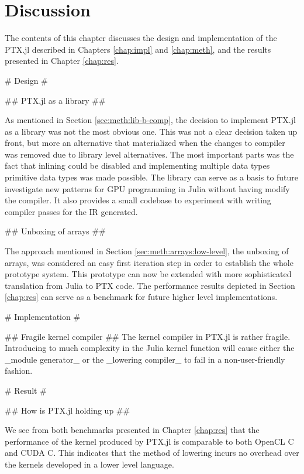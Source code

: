 \chapter{Discussion}
\begin{markdown}

The contents of this chapter discusses the design and implementation
of the PTX.jl described in Chapters \ref{chap:impl} and
\ref{chap:meth}, and the results presented in Chapter \ref{chap:res}.

# Design #

## PTX.jl as a library ##

As mentioned in Section \ref{sec:meth:lib-b-comp}, the decision to
implement PTX.jl as a library was not the most obvious one. This was
not a clear decision taken up front, but more an alternative that
materialized when the changes to compiler was removed due to library
level alternatives. The most important parts was the fact that
inlining could be disabled and implementing multiple data types
primitive data types was made possible. The library can serve as a
basis to future investigate new patterns for GPU programming in Julia
without having modify the compiler. It also provides a small codebase
to experiment with writing compiler passes for the IR generated.

## Unboxing of arrays ##
 
The approach mentioned in Section \ref{sec:meth:arrays:low-level}, the
unboxing of arrays, was considered an easy first iteration step in
order to establish the whole prototype system. This prototype can now
be extended with more sophisticated translation from Julia to PTX
code. The performance results depicted in Section \ref{chap:res} can
serve as a benchmark for future higher level implementations. 

# Implementation #

## Fragile kernel compiler ##
\label{sec:disc:comp}
The kernel compiler in PTX.jl is rather fragile. Introducing to much
complexity in the Julia kernel function will cause either the _module
generator_ or the _lowering compiler_ to fail in a non-user-friendly
fashion.

# Result #

## How is PTX.jl holding up ##

We see from both benchmarks presented in Chapter \ref{chap:res} that
the performance of the kernel produced by PTX.jl is comparable to both
OpenCL C and CUDA C. This indicates that the method of lowering
incurs no overhead over the kernels developed in a lower level
language. 


\end{markdown}
